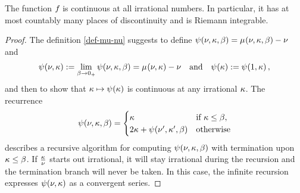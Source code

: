   
  \begin{theorem}\label{thm.integrable}
    The function $f_{}$ is continuous at all irrational numbers.
    In particular, it has at most countably many places of discontinuity
    and is Riemann integrable.
  \end{theorem}
  \begin{proof}
    The definition \eqref{def-mu-nu} suggests to define
    $\EssentialCostOf{\TheTotal,\TheLength,\BufLength}=
    \SimpleCostOf{\TheTotal,\TheLength,\BufLength} - \TheTotal$
    and %
    \begin{equation}\label{defpsi}
      \EssentialCostOf{\TheTotal,\TheLength}
      :=
      \lim_{\BufLength\rightarrow 0_+}
      \EssentialCostOf{\TheTotal,\TheLength,\BufLength}
      =
      \SimpleCostOf{\TheTotal,\TheLength}-\TheTotal
      \quad\text{and}\quad
      \EssentialCostOf{\TheLength}:= \EssentialCostOf{1, \TheLength},
    \end{equation}
    and then to show that $\TheLength\mapsto\EssentialCostOf{\TheLength}$ is
    continuous at any irrational $\kappa$. The recurrence
    \begin{equation}\label{essential-recurrence}
      \EssentialCostOf{ \TheTotal, \TheLength, \BufLength }
      =
      \begin{cases}
        \TheLength & \text{if\ } \TheLength \leq \BufLength, \\
        2\TheLength
        +
        \EssentialCostOf{\TheTotal',\TheLength',\BufLength}
                   & \text{otherwise}
      \end{cases}
    \end{equation}
    describes a recursive algorithm for
    computing $\EssentialCostOf{\TheTotal,\TheLength,\BufLength}$
    with termination upon $\kappa \leq \beta$. %
     If
    $\frac{\kappa}{\nu}$ starts out irrational, it will stay
    irrational during the recursion and the termination branch will never
    be taken. In this case, the infinite recursion expresses 
    $\EssentialCostOf{ \TheTotal, \TheLength }$ as a convergent series. 

\end{proof}
